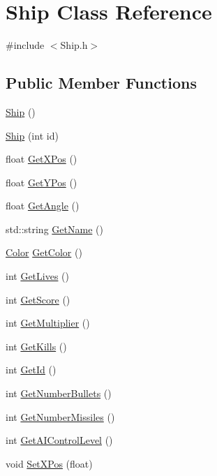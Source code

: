 \hypertarget{classShip}{\section{Ship Class Reference}
\label{classShip}
}


{\ttfamily \#include $<$Ship.\-h$>$}

\subsection*{Public Member Functions}
\begin{DoxyCompactItemize}
\item 
\hyperlink{classShip_ab7608fcfc4d27c678aacaf9bfd68a462}{Ship} ()
\item 
\hyperlink{classShip_ab8661dae4897225f6a453544b0d97fd7}{Ship} (int id)
\item 
float \hyperlink{classShip_a62d1590ac730f2992ebd1f543a4c080b}{Get\-X\-Pos} ()
\item 
float \hyperlink{classShip_a7a21f2cb59b35a7a13c01d46737a2fb6}{Get\-Y\-Pos} ()
\item 
float \hyperlink{classShip_a9e8f81b8623d534dc802e60b2191fae2}{Get\-Angle} ()
\item 
std\-::string \hyperlink{classShip_a5fb7114f5e303984ff6a732dcba66b34}{Get\-Name} ()
\item 
\hyperlink{classColor}{Color} \hyperlink{classShip_a8143324f77feccd1f7818e898c6f2736}{Get\-Color} ()
\item 
int \hyperlink{classShip_a7353a3d424dcea7c57e8b4cfeb9d54dc}{Get\-Lives} ()
\item 
int \hyperlink{classShip_a3253a348df922814e770d4b59b81c2d4}{Get\-Score} ()
\item 
int \hyperlink{classShip_addfa542f5323ee5853c71b627d083d0d}{Get\-Multiplier} ()
\item 
int \hyperlink{classShip_a7d400b73d3bd985838be2d5d85e5b2a0}{Get\-Kills} ()
\item 
int \hyperlink{classShip_a914fe544089d31e249cac55071fad056}{Get\-Id} ()
\item 
int \hyperlink{classShip_a1f9c2ea713767e08fc9a386da29a46f2}{Get\-Number\-Bullets} ()
\item 
int \hyperlink{classShip_acd4d05082f4d686b14eba21f484b9eea}{Get\-Number\-Missiles} ()
\item 
int \hyperlink{classShip_a509bcaedd75832528d575d9754d5f774}{Get\-A\-I\-Control\-Level} ()
\item 
void \hyperlink{classShip_a5e62d51a5644e58f334c9c8db76de1e3}{Set\-X\-Pos} (float)

\end{DoxyCompactItemize}
